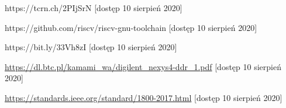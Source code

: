 \documentclass[11pt,a4paper]{article}
\begin{document}
\begin{thebibliography}{10}
	 https://tcrn.ch/2PIjSrN [dostęp 10 sierpień 2020]

	 https://github.com/riscv/riscv-gnu-toolchain [dostęp 10 sierpień 2020]
	
	 https://bit.ly/33Vh8zI [dostęp 10 sierpień 2020]
	
	 \url{https://dl.btc.pl/kamami\_wa/digilent\_nexys4-ddr\_1.pdf} [dostęp 10 sierpień 2020]
	
	 \url{https://standards.ieee.org/standard/1800-2017.html} [dostęp 10 sierpień 2020]

\end{thebibliography}
\end{document}
